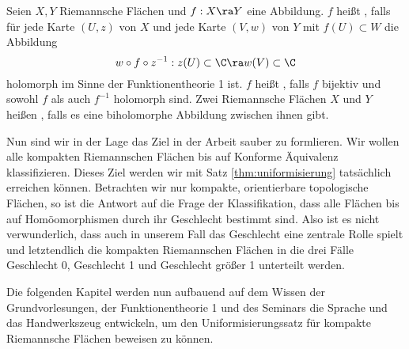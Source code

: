 \begin{defin}
  Seien $X,Y$ Riemannsche Flächen und $f: X \ra Y$ eine Abbildung. $f$
  heißt , falls für jede Karte $(U,z)$ von $X$ und
  jede Karte $(V, w)$ von $Y$ mit $f(U) \subset W$ die Abbildung
  \[
  w \circ f \circ z^{-1} : z(U) \subset \C \ra w(V) \subset \C
  \]
  holomorph im Sinne der Funktionentheorie 1 ist. $f$ heißt
  , falls $f$ bijektiv und sowohl $f$ als auch $f^{-1}$
  holomorph sind. Zwei Riemannsche Flächen $X$ und $Y$ heißen , falls es eine biholomorphe Abbildung zwischen ihnen gibt.
\end{defin}

Nun sind wir in der Lage das Ziel in der Arbeit sauber zu
formlieren. Wir wollen alle kompakten Riemannschen Flächen bis auf
Konforme Äquivalenz klassifizieren. Dieses Ziel werden wir mit Satz
\ref{thm:uniformisierung} tatsächlich erreichen können. Betrachten wir
nur kompakte, orientierbare topologische Flächen, so ist die Antwort
auf die Frage der Klassifikation, dass alle Flächen bis auf
Homöomorphismen durch ihr Geschlecht bestimmt sind. Also ist es nicht
verwunderlich, dass auch in unserem Fall das Geschlecht eine zentrale
Rolle spielt und letztendlich die kompakten Riemannschen Flächen in
die drei Fälle Geschlecht 0, Geschlecht 1 und Geschlecht größer 1
unterteilt werden.

Die folgenden Kapitel werden nun aufbauend auf dem Wissen der
Grundvorlesungen, der Funktionentheorie 1 und des Seminars die Sprache
und das Handwerkszeug entwickeln, um den Uniformisierungssatz für
kompakte Riemannsche Flächen beweisen zu können.


